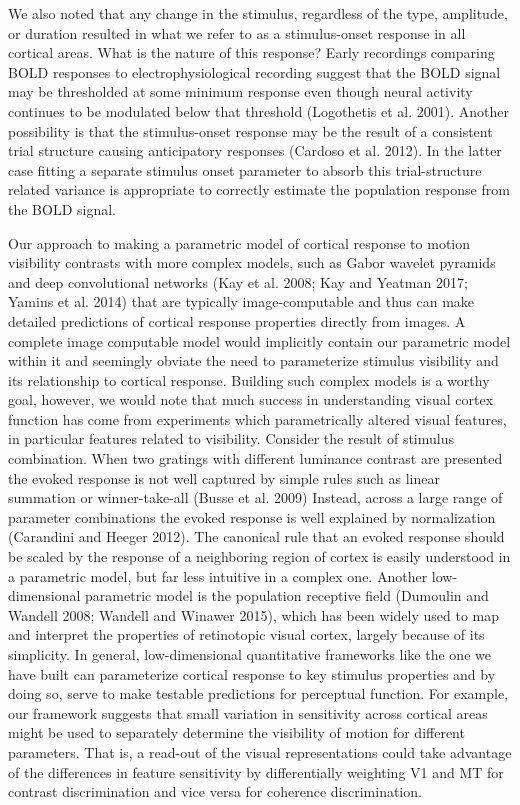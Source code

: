 \documentclass{report}
\begin{document}
We also noted that any change in the stimulus, regardless of the type, amplitude, or duration resulted in what we refer to as a stimulus-onset response in all cortical areas. What is the nature of this response? Early recordings comparing BOLD responses to electrophysiological recording suggest that the BOLD signal may be thresholded at some minimum response even though neural activity continues to be modulated below that threshold (Logothetis et al. 2001). Another possibility is that the stimulus-onset response may be the result of a consistent trial structure causing anticipatory responses (Cardoso et al. 2012). In the latter case fitting a separate stimulus onset parameter to absorb this trial-structure related variance is appropriate to correctly estimate the population response from the BOLD signal.

Our approach to making a parametric model of cortical response to motion visibility contrasts with more complex models, such as Gabor wavelet pyramids and deep convolutional networks (Kay et al. 2008; Kay and Yeatman 2017; Yamins et al. 2014) that are typically image-computable and thus can make detailed predictions of cortical response properties directly from images. A complete image computable model would implicitly contain our parametric model within it and seemingly obviate the need to parameterize stimulus visibility and its relationship to cortical response. Building such complex models is a worthy goal, however, we would note that much success in understanding visual cortex function has come from experiments which parametrically altered visual features, in particular features related to visibility. Consider the result of stimulus combination. When two gratings with different luminance contrast are presented the evoked response is not well captured by simple rules such as linear summation or winner-take-all (Busse et al. 2009) Instead, across a large range of parameter combinations the evoked response is well explained by normalization (Carandini and Heeger 2012). The canonical rule that an evoked response should be scaled by the response of a neighboring region of cortex is easily understood in a parametric model, but far less intuitive in a complex one. Another low-dimensional parametric model is the population receptive field (Dumoulin and Wandell 2008; Wandell and Winawer 2015), which has been widely used to map and interpret the properties of retinotopic visual cortex, largely because of its simplicity. In general, low-dimensional quantitative frameworks like the one we have built can parameterize cortical response to key stimulus properties and by doing so, serve to make testable predictions for perceptual function. For example, our framework suggests that small variation in sensitivity across cortical areas might be used to separately determine the visibility of motion for different parameters. That is, a read-out of the visual representations could take advantage of the differences in feature sensitivity by differentially weighting V1 and MT for contrast discrimination and vice versa for coherence discrimination.
\end{document}
